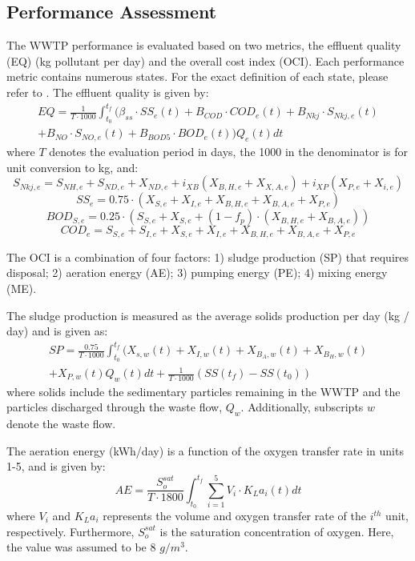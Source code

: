 \subsection{Performance Assessment}
The WWTP performance is evaluated based on two metrics, the effluent quality (EQ) (kg pollutant per day) and the overall cost index (OCI). Each performance metric contains numerous states.  For the exact definition of each state, please refer to \cite{wwtp}.  The effluent quality is given by:
\begin{multline}
    EQ = \frac{1}{T \cdot 1000} \int^{t_f}_{t_0} ( \beta_{ss} \cdot SS_e(t) + B_{COD} \cdot COD_e(t) + B_{Nkj} \cdot S_{Nkj, e}(t) \\ 
    + B_{NO} \cdot S_{NO, e}(t) + B_{BOD5} \cdot BOD_e(t)) Q_e(t) dt
\end{multline}
where $T$ denotes the evaluation period in days, the 1000 in the denominator is for unit conversion to kg, and:
$$S_{Nkj, e} = S_{NH, e} + S_{ND, e} + X_{ND, e} + i_{XB}(X_{B, H, e} + X_{X, A, e}) + i_{XP} (X_{P, e} + X_{i, e})$$
$$SS_e = 0.75 \cdot (X_{S, e} + X_{I, e} + X_{B, H, e} + X_{B, A, e} + X_{P, e})$$
$$BOD_{S, e} = 0.25 \cdot (S_{S, e} + X_{S, e} + (1 - f_p) \cdot (X_{B, H, e} + X_{B, A, e}))$$
$$COD_e = S_{S, e} + S_{I, e} + X_{S, e} + X_{I, e} + X_{B, H, e} + X_{B, A, e} + X_{P, e}$$

The OCI is a combination of four factors: 1) sludge production (SP) that requires disposal; 2) aeration energy (AE); 3) pumping energy (PE);  4) mixing energy (ME). 

The sludge production is measured as the average solids production per day (kg / day) and is given as:
\begin{multline}
    SP = \frac{0.75}{T \cdot 1000} \int_{t_0}^{t_f} (X_{s, w}(t) + X_{I, w}(t) + X_{B_A, w}(t) + X_{B_H, w}(t) \\ 
    + X_{P, w}(t) Q_w(t)dt + \frac{1}{T \cdot 1000} (SS(t_f) - SS(t_0))
\end{multline}
where solids include the sedimentary particles remaining in the WWTP and the particles discharged through the waste flow, $Q_w$. Additionally, subscripts $w$ denote the waste flow.

The aeration energy (kWh/day) is a function of the oxygen transfer rate in units 1-5, and is given by:
\begin{equation}
    AE = \frac{S_o^{sat}}{T \cdot 1800} \int_{t_0}^{t_f} \sum\limits^5_{i = 1} V_i \cdot K_La_i (t) dt
\end{equation}
where $V_i$ and $K_La_i$ represents the volume and oxygen transfer rate of the $i^{th}$ unit, respectively. Furthermore, $S_o^{sat}$ is the saturation concentration of oxygen.  Here, the value was assumed to be 8 $g/m^3$.

